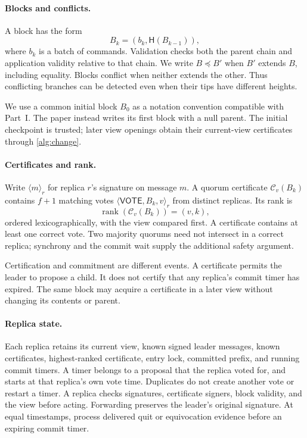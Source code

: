 \documentclass[11pt,a4paper]{article}
\newcommand{\QC}{\mathcal C}
\newcommand{\Hash}{\mathsf H}
\newcommand{\rank}{\operatorname{rank}}
\newcommand{\tagg}[1]{\ensuremath{\mathsf{#1}}}
\newcommand{\signed}[2]{\langle #1\rangle_{#2}}
\begin{document}
\paragraph{Blocks and conflicts.}
A block has the form
\[
 B_k=(b_k,\Hash(B_{k-1})),
\]
where $b_k$ is a batch of commands. Validation checks both the parent
chain and application validity relative to that chain. We write
$B\preceq B'$ when $B'$ extends $B$, including equality. Blocks conflict
when neither extends the other. Thus conflicting branches can be
detected even when their tips have different heights.

We use a common initial block $B_0$ as a notation convention compatible
with Part~I. The paper instead writes its first block with a null parent.
The initial checkpoint is trusted; later view openings obtain their
current-view certificates through \cref{alg:change}.

\paragraph{Certificates and rank.}
Write $\signed{m}{r}$ for replica $r$'s signature on message $m$.
A quorum certificate $\QC_v(B_k)$ contains $f+1$ matching votes
$\signed{\tagg{VOTE},B_k,v}{r}$ from distinct replicas. Its rank is
\[
 \rank(\QC_v(B_k))=(v,k),
\]
ordered lexicographically, with the view compared first. A certificate
contains at least one correct vote. Two majority quorums need not
intersect in a correct replica; synchrony and the commit wait supply
the additional safety argument.

Certification and commitment are different events. A certificate permits
the leader to propose a child. It does not certify that any replica's
commit timer has expired. The same block may acquire a certificate in a
later view without changing its contents or parent.

\paragraph{Replica state.}
Each replica retains its current view, known signed leader messages,
known certificates, highest-ranked certificate, entry lock, committed
prefix, and running commit timers. A timer belongs to a proposal that
the replica voted for, and starts at that replica's own vote time.
Duplicates do not create another vote or restart a timer. A replica
checks signatures, certificate signers, block validity, and the view
before acting. Forwarding preserves the leader's original signature.
At equal timestamps, process delivered quit or equivocation evidence
before an expiring commit timer.
\end{document}

